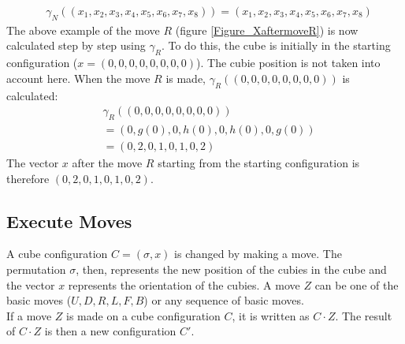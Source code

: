 \documentclass[12pt,a4paper]{article}
\theoremstyle{custom}
\begin{document}
\begin{align*}
& \gamma_N \left( (x_1, x_2, x_3, x_4, x_5, x_6, x_7, x_8  ) \right) =  \left( x_1, x_2, x_3, x_4, x_5, x_6, x_7, x_8 \right)
\end{align*}
The above example of the move $R$ (figure \ref{Figure_XaftermoveR}) is now calculated step by step using $\gamma_R$. To do this, the cube is initially in the starting configuration ($x = (0, 0, 0, 0, 0, 0, 0, 0)$). The cubie position is not taken into account here. When the move $R$ is made, $\gamma_R( (0, 0, 0, 0, 0, 0, 0, 0) )$ is calculated:
\begin{align*}
& \gamma_R( (0, 0, 0, 0, 0, 0, 0, 0) ) \\
& = (0, g(0), 0, h(0), 0, h(0), 0, g(0)) \\
& = (0, 2, 0, 1, 0, 1, 0, 2)
\end{align*}
The vector $x$ after the move $R$ starting from the starting configuration is therefore $(0, 2, 0, 1, 0, 1, 0, 2)$.

\subsection{Execute Moves}
\label{Section_MovementExecute}
A cube configuration $C=(\sigma, x)$ is changed by making a move.
The permutation $\sigma$, then, represents the new position of the cubies in the cube and the vector $x$ represents the orientation of the cubies. A move $Z$ can be one of the basic moves ($U,D,R,L,F,B$) or any sequence of basic moves. \\
If a move $Z$ is made on a cube configuration $C$, it is written as $C \cdot Z$. The result of $C \cdot Z$ is then a new configuration $C'$.
\end{document}
